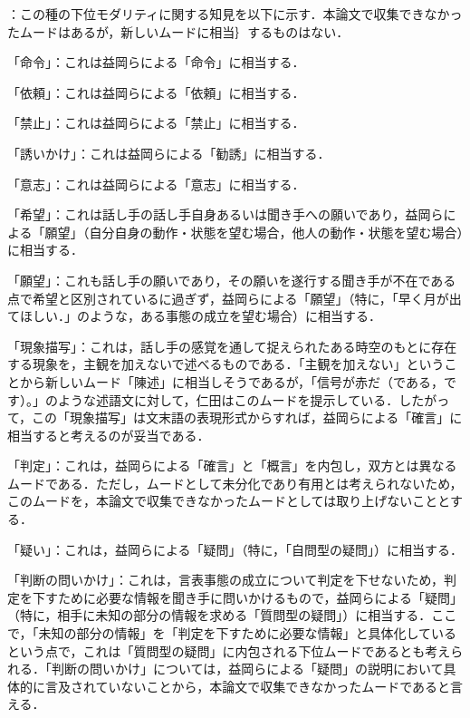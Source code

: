 \documentclass[japanese]{jnlp_1.4}
\newcommand{\InH}[1]{}
\newcommand{\InHone}[1]{}
\begin{document}
\InHone{(a)}
：この種の下位モダリティに関する知見を以下に示す．本論文で収集できなかったムードはあるが，新しいムードに相当｝するものはない．

\InH{(a-1)}「命令」：これは益岡らによる「命令」に相当する．

\InH{(a-2)}「依頼」：これは益岡らによる「依頼」に相当する．

\InH{(a-3)}「禁止」：これは益岡らによる「禁止」に相当する．

\InH{(a-4)}「誘いかけ」：これは益岡らによる「勧誘」に相当する．

\InH{(a-5)}「意志」：これは益岡らによる「意志」に相当する．

\InH{(a-6)}「希望」：これは話し手の話し手自身あるいは聞き手への願いであり，益岡らによる「願望」（自分自身の動作・状態を望む場合，他人の動作・状態を望む場合）に相当する．

\InH{(a-7)}「願望」：これも話し手の願いであり，その願いを遂行する聞き手が不在である点で希望と区別されているに過ぎず，益岡らによる「願望」（特に，「早く月が出てほしい．」のような，ある事態の成立を望む場合）に相当する．

\InH{(a-8)}「現象描写」：これは，話し手の感覚を通して捉えられたある時空のもとに存在する現象を，主観を加えないで述べるものである．「主観を加えない」ということから新しいムード「陳述」に相当しそうであるが，「信号が赤だ（である，です）。」のような述語文に対して，仁田はこのムードを提示している．したがって，この「現象描写」は文末語の表現形式からすれば，益岡らによる「確言」に相当すると考えるのが妥当である．

\InH{(a-9)}「判定」：これは，益岡らによる「確言」と「概言」を内包し，双方とは異なるムードである．ただし，ムードとして未分化であり有用とは考えられないため，このムードを，本論文で収集できなかったムードとしては取り上げないこととする．

\InH{(a-10)}「疑い」：これは，益岡らによる「疑問」（特に，「自問型の疑問」）に相当する．

\InH{(a-11)}「判断の問いかけ」：これは，言表事態の成立について判定を下せないため，判定を下すために必要な情報を聞き手に問いかけるもので，益岡らによる「疑問」（特に，相手に未知の部分の情報を求める「質問型の疑問」）に相当する．ここで，「未知の部分の情報」を「判定を下すために必要な情報」と具体化しているという点で，これは「質問型の疑問」に内包される下位ムードであるとも考えられる．「判断の問いかけ」については，益岡らによる「疑問」の説明において具体的に言及されていないことから，本論文で収集できなかったムードであると言える．
\end{document}
